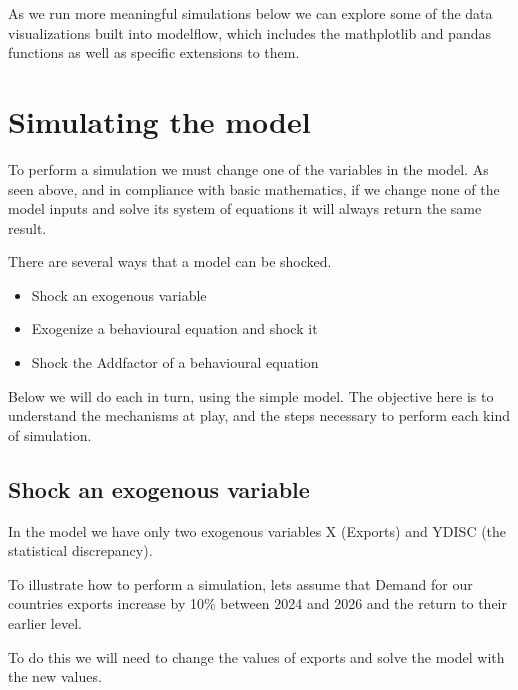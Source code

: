 \documentclass[letterpaper,10pt,english]{jupyterBook}
\begin{document}
\sphinxAtStartPar
As we run more meaningful simulations below we can explore some of the data visualizations built into modelflow, which includes the mathplotlib and pandas  functions as well as  specific extensions to them.


\section{Simulating the model}
\label{\detokenize{content/05_SimpleModel/SimpleModel:simulating-the-model}}
\sphinxAtStartPar
To perform a simulation we must change one of the variables in the model.  As seen above, and in compliance with basic mathematics, if we change none of the model inputs and solve its system of equations it will always return the same result.

\sphinxAtStartPar
There are several ways that a model can be shocked.
\begin{itemize}
\item {} 
\sphinxAtStartPar
Shock an exogenous variable

\item {} 
\sphinxAtStartPar
Exogenize a behavioural equation and shock it

\item {} 
\sphinxAtStartPar
Shock the Add\sphinxhyphen{}factor of a behavioural equation

\end{itemize}

\sphinxAtStartPar
Below we will do each in turn, using the simple model.  The objective here is to understand the mechanisms at play, and the steps necessary to perform each kind of simulation.


\subsection{Shock an exogenous variable}
\label{\detokenize{content/05_SimpleModel/SimpleModel:shock-an-exogenous-variable}}
\sphinxAtStartPar
In the model we have only two exogenous variables X (Exports) and YDISC (the statistical discrepancy).

\sphinxAtStartPar
To illustrate how to perform a simulation, lets assume that Demand for our countries exports increase by 10\% between 2024 and 2026 and the return to their earlier level.

\sphinxAtStartPar
To do this we will need to change the values of exports and solve the model with the new values.
\end{document}
